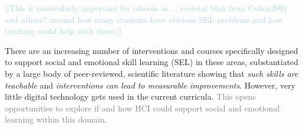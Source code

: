 \documentclass[prodmode,acmtochi]{acmsmall}
\newcommand{\todo}[1]{\textrm{\textrm{\textcolor{LightBlue}{[[#1]]} } } }
\newcommand{\rephrase}[1]{\textrm{\textrm{\textcolor{gray}{#1}}}}
\begin{document}
\todo{This is particularly important for schools as ... societal blah from Cohen2001 and others? around how many students have obvious SEL problems and how teaching could help with these.}

There are an increasing number of interventions and courses specifically designed to support social and emotional skill learning (SEL) in these areas, substantiated by a large body of peer-reviewed, scientific literature showing that \emph{such skills are teachable} and \emph{interventions can lead to measurable improvements}. 
However, very little digital technology gets used in the current curricula. \rephrase{This opens opportunities to explore if and how HCI could support social and emotional learning within this domain.}

\end{document}
